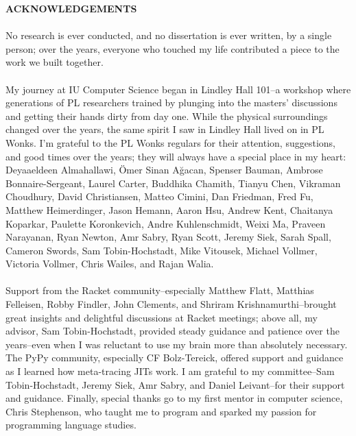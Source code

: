 \begin{centering}
\textbf{ACKNOWLEDGEMENTS}\\
\vspace{\baselineskip}
\end{centering}

\paragraph{}%
  No research is ever conducted, and no dissertation is ever written, by a single person; over the years, everyone who touched my life contributed a piece to the work we built together.

\paragraph{}%
  My journey at IU Computer Science began in Lindley Hall 101--a workshop where generations of PL researchers trained by plunging into the masters' discussions and getting their hands dirty from day one. While the physical surroundings changed over the years, the same spirit I saw in Lindley Hall lived on in PL Wonks. I'm grateful to the PL Wonks regulars for their attention, suggestions, and good times over the years; they will always have a special place in my heart: Deyaaeldeen Almahallawi, Ömer Sinan Ağacan, Spenser Bauman, Ambrose Bonnaire-Sergeant, Laurel Carter, Buddhika Chamith, Tianyu Chen, Vikraman Choudhury, David Christiansen, Matteo Cimini, Dan Friedman, Fred Fu, Matthew Heimerdinger, Jason Hemann, Aaron Hsu, Andrew Kent, Chaitanya Koparkar, Paulette Koronkevich, Andre Kuhlenschmidt, Weixi Ma, Praveen Narayanan, Ryan Newton, Amr Sabry, Ryan Scott, Jeremy Siek, Sarah Spall, Cameron Swords, Sam Tobin-Hochstadt, Mike Vitousek, Michael Vollmer, Victoria Vollmer, Chris Wailes, and Rajan Walia.

\paragraph{}%
  Support from the Racket community--especially Matthew Flatt, Matthias Felleisen, Robby Findler, John Clements, and Shriram Krishnamurthi--brought great insights and delightful discussions at Racket meetings; above all, my advisor, Sam Tobin-Hochstadt, provided steady guidance and patience over the years--even when I was reluctant to use my brain more than absolutely necessary. The PyPy community, especially CF Bolz-Tereick, offered support and guidance as I learned how meta-tracing JITs work. I am grateful to my committee--Sam Tobin-Hochstadt, Jeremy Siek, Amr Sabry, and Daniel Leivant--for their support and guidance. Finally, special thanks go to my first mentor in computer science, Chris Stephenson, who taught me to program and sparked my passion for programming language studies.

